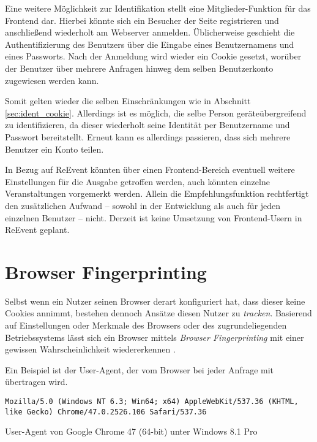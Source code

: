 \begin{appendices}
Eine weitere Möglichkeit zur Identifikation stellt eine Mitglieder-Funktion für das Frontend dar. Hierbei könnte sich ein Besucher der Seite registrieren und anschließend wiederholt am Webserver anmelden. Üblicherweise geschieht die Authentifizierung des Benutzers über die Eingabe eines Benutzernamens und eines Passworts. Nach der Anmeldung wird wieder ein Cookie gesetzt, worüber der Benutzer über mehrere Anfragen hinweg dem selben Benutzerkonto zugewiesen werden kann.

Somit gelten wieder die selben Einschränkungen wie in Abschnitt \ref{sec:ident_cookie}. Allerdings ist es möglich, die selbe Person geräteübergreifend zu identifizieren, da dieser wiederholt seine Identität per Benutzername und Passwort bereitstellt. Erneut kann es allerdings passieren, dass sich mehrere Benutzer ein Konto teilen.

In Bezug auf ReEvent könnten über einen Frontend-Bereich eventuell weitere Einstellungen für die Ausgabe getroffen werden, auch könnten einzelne Veranstaltungen vorgemerkt werden. Allein die Empfehlungsfunktion rechtfertigt den zusätzlichen Aufwand -- sowohl in der Entwicklung als auch für jeden einzelnen Benutzer -- nicht. Derzeit ist keine Umsetzung von Frontend-Usern in ReEvent geplant.

\section{Browser Fingerprinting}

Selbst wenn ein Nutzer seinen Browser derart konfiguriert hat, dass dieser keine Cookies annimmt, bestehen dennoch Ansätze diesen Nutzer zu \emph{tracken}. Basierend auf Einstellungen oder Merkmale des Browsers oder des zugrundeliegenden Betriebssystems lässt sich ein Browser mittels \emph{Browser Fingerprinting} mit einer gewissen Wahrscheinlichkeit wiedererkennen \cite[S. 185]{Boos.2015}.

Ein Beispiel ist der User-Agent, der vom Browser bei jeder Anfrage mit übertragen wird.

\begin{listing}[ht!]
\begin{verbatim}
Mozilla/5.0 (Windows NT 6.3; Win64; x64) AppleWebKit/537.36 (KHTML, like Gecko) Chrome/47.0.2526.106 Safari/537.36
\end{verbatim}
\caption{User-Agent von Google Chrome 47 (64-bit) unter Windows 8.1 Pro}
\label{lst:google_chrome_useragent}
\end{listing}


\end{appendices}
